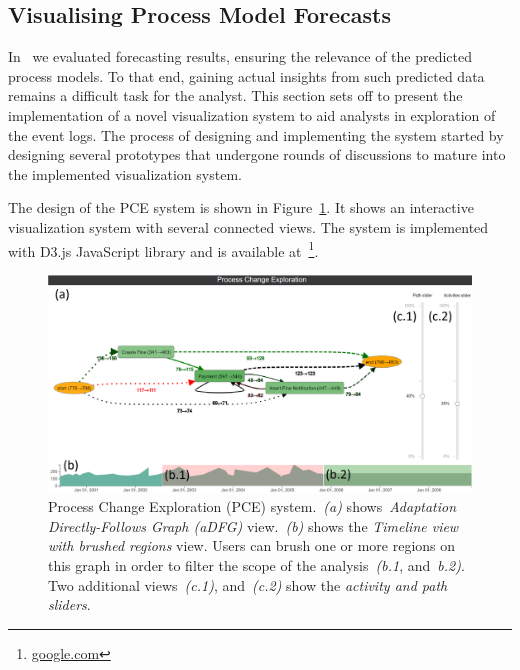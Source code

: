 \subsection{Visualising Process Model Forecasts}\label{sec:visualisation}

In~ we evaluated forecasting results, ensuring the relevance of the predicted process models. To that end, gaining actual insights from such predicted data remains a difficult task for the analyst. This section sets off to present the implementation of a novel visualization system to aid analysts in exploration of the event logs. The process of designing and implementing the system started by designing several prototypes that undergone rounds of discussions to mature into the implemented visualization system. 

The design of the PCE system is shown in Figure~\ref{fig:vis-two-brushes}. It shows an interactive visualization system with several connected views. The system is implemented with D3.js JavaScript library and is available at~\footnote{\url{google.com}}.


\begin{figure}
	\centering
	\includegraphics[width=\textwidth]{img/vis/actual-predicted-two-brushed-regions-system.PNG}
	\caption{Process Change Exploration (PCE) system.~\emph{(a)} shows~\emph{Adaptation Directly-Follows Graph (aDFG)} view.~\emph{(b)} shows the \emph{Timeline view with brushed regions} view. Users can brush one or more regions on this graph in order to filter the scope of the analysis~\emph{(b.1}, and~\emph{b.2)}. Two additional views~\emph{(c.1)}, and~\emph{(c.2)} show the \emph{activity and path sliders}.} 
	\label{fig:vis-two-brushes}
\end{figure}